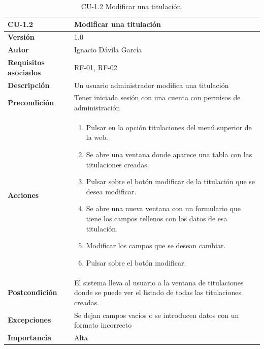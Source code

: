\begin{table}[p]
	\centering
	\begin{tabularx}{\linewidth}{ p{} p{} }
		\toprule
		\textbf{CU-1.2}    & \textbf{Modificar una titulación}\\
		\toprule
		\textbf{Versión}              & 1.0    \\
		\textbf{Autor}                & Ignacio Dávila García \\
		\textbf{Requisitos asociados} & RF-01, RF-02 \\
		\textbf{Descripción}          & Un usuario administrador modifica una titulación \\
		\textbf{Precondición}         & Tener iniciada sesión con una cuenta con permisos de administración \\
		\textbf{Acciones}             &
		\begin{enumerate}
			\def\labelenumi{\arabic{enumi}.}
			\tightlist
			\item Pulsar en la opción titulaciones del menú superior de la web.
			\item Se abre una ventana donde aparece una tabla con las titulaciones creadas.
			\item Pulsar sobre el botón modificar de la titulación que se desea modificar.
			\item Se abre una nueva ventana con un formulario que tiene los campos rellenos con los datos de esa titulación.
			\item Modificar los campos que se desean cambiar.
			\item Pulsar sobre el botón modificar.
		\end{enumerate}\\
		\textbf{Postcondición}        & El sistema lleva al usuario a la ventana de titulaciones donde se puede ver el listado de todas las titulaciones creadas. \\
		\textbf{Excepciones}          & Se dejan campos vacíos o se introducen datos con un formato incorrecto \\
		\textbf{Importancia}          & Alta \\
		\bottomrule
	\end{tabularx}
	\caption{CU-1.2 Modificar una titulación.}
\end{table}


